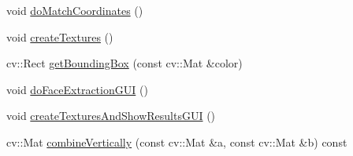 \begin{DoxyCompactItemize}
\item 
void \hyperlink{class_face3_d_1_1_detection_a0cf36050ade66d18074b6fa78ee7c7ca}{do\+Match\+Coordinates} ()
\item 
void \hyperlink{class_face3_d_1_1_detection_a7a6c141eb4ecee4385a84b541275f1df}{create\+Textures} ()
\item 
cv\+::\+Rect \hyperlink{class_face3_d_1_1_detection_ac4cc64a1037a3e09f8e7b8016528bafd}{get\+Bounding\+Box} (const cv\+::\+Mat \&color)
\item 
void \hyperlink{class_face3_d_1_1_detection_a67a87b44d2ab09621b801ee8e0def41b}{do\+Face\+Extraction\+G\+UI} ()
\item 
void \hyperlink{class_face3_d_1_1_detection_a3c778bd31454950913a53a71b97a137d}{create\+Textures\+And\+Show\+Results\+G\+UI} ()
\item 
cv\+::\+Mat \hyperlink{class_face3_d_1_1_detection_aacd34a01327ecdccad51559902aa3c0d}{combine\+Vertically} (const cv\+::\+Mat \&a, const cv\+::\+Mat \&b) const 
\end{DoxyCompactItemize}

